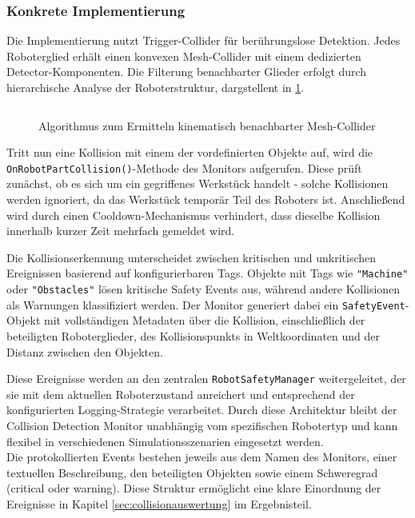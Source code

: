 \subsubsection{Konkrete Implementierung}
\noindent
Die Implementierung nutzt Trigger-Collider für berührungslose Detektion. Jedes
Roboterglied erhält einen konvexen Mesh-Collider mit einem dedizierten
Detector-Komponenten. Die Filterung benachbarter Glieder erfolgt durch hierarchische Analyse der
Roboterstruktur, dargstellent in \ref{listing:adjacentFrames}.

\begin{figure}[H]
	\inputminted[fontsize=\footnotesize]{csharp}{code-snippets/SetupAdjacentFramesIgnoring.cs}
	\caption{Algorithmus zum Ermitteln kinematisch benachbarter Mesh-Collider}
	\label{listing:adjacentFrames}
\end{figure}

\noindent
Tritt nun eine Kollision mit einem der vordefinierten Objekte auf, wird die
\texttt{OnRobotPartCollision()}-Methode des Monitors aufgerufen. Diese prüft
zunächst, ob es sich um ein gegriffenes Werkstück handelt - solche Kollisionen
werden ignoriert, da das Werkstück temporär Teil des Roboters ist. Anschließend
wird durch einen Cooldown-Mechanismus verhindert, dass dieselbe Kollision
innerhalb kurzer Zeit mehrfach gemeldet wird.

\noindent
Die Kollisionserkennung unterscheidet zwischen kritischen und unkritischen
Ereignissen basierend auf konfigurierbaren Tags. Objekte mit Tags wie
\texttt{"Machine"} oder \texttt{"Obstacles"} lösen kritische Safety Events aus,
während andere Kollisionen als Warnungen klassifiziert werden. Der Monitor
generiert dabei ein \texttt{SafetyEvent}-Objekt mit vollständigen Metadaten
über die Kollision, einschließlich der beteiligten Roboterglieder, des
Kollisionspunkts in Weltkoordinaten und der Distanz zwischen den Objekten.

\noindent
Diese Ereignisse werden an den zentralen \texttt{RobotSafetyManager}
weitergeleitet, der sie mit dem aktuellen Roboterzustand anreichert und
entsprechend der konfigurierten Logging-Strategie verarbeitet. Durch diese
Architektur bleibt der Collision Detection Monitor unabhängig vom spezifischen
Robotertyp und kann flexibel in verschiedenen Simulationsszenarien eingesetzt
werden.\\

\noindent
Die protokollierten Events bestehen jeweils aus dem Namen des Monitors,
einer textuellen Beschreibung, den beteiligten Objekten sowie einem
Schweregrad (critical oder warning). Diese Struktur ermöglicht eine
klare Einordnung der Ereignisse in Kapitel \ref{sec:collisionauswertung} im Ergebnisteil.
